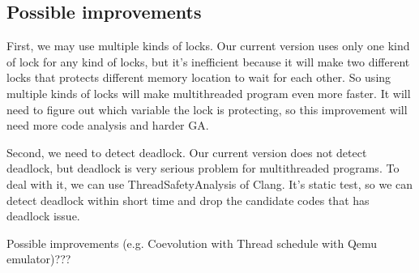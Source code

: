 \subsection{Possible improvements}
First, we may use multiple kinds of locks. Our current version uses only one kind of lock for any kind of locks, but it's inefficient because it will make two different locks that protects different memory location to wait for each other. So using multiple kinds of locks will make multithreaded program even more faster. It will need to figure out which variable the lock is protecting, so this improvement will need more code analysis and harder GA.

Second, we need to detect deadlock. Our current version does not detect deadlock, but deadlock is very serious problem for multithreaded programs. To deal with it, we can use ThreadSafetyAnalysis of Clang. It's static test, so we can detect deadlock within short time and drop the candidate codes that has deadlock issue.

Possible improvements (e.g. Coevolution with Thread schedule with Qemu emulator)???

